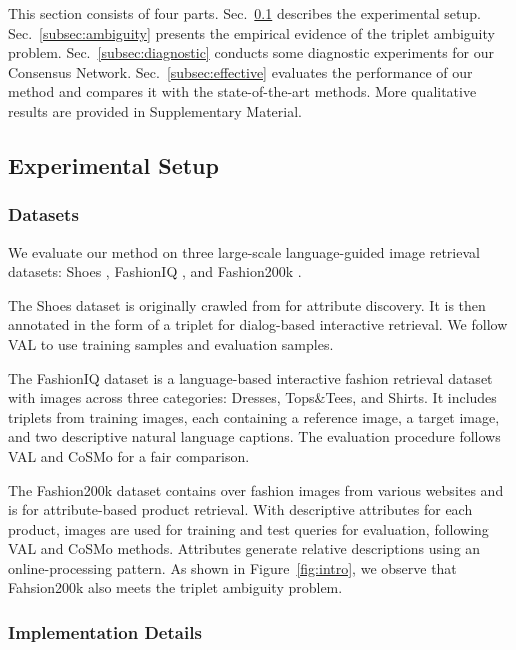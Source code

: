\documentclass[sigconf]{acmart}
\begin{document}
This section consists of four parts. Sec.~\ref{subsec:implement} describes the experimental setup. Sec.~\ref{subsec:ambiguity} presents the empirical evidence of the triplet ambiguity problem. Sec.~\ref{subsec:diagnostic} conducts some diagnostic experiments for our Consensus Network. Sec.~\ref{subsec:effective} evaluates the performance of our method and compares it with the state-of-the-art methods. More qualitative results are provided in Supplementary Material.

\subsection{Experimental Setup}
\label{subsec:implement}
\subsubsection{Datasets} 

We evaluate our method on three large-scale language-guided image retrieval datasets: Shoes \cite{berg2010automatic}, FashionIQ \cite{wu2021fashion}, and Fashion200k \cite{vo2019composing}.

The Shoes dataset \cite{berg2010automatic} is originally crawled from  for attribute discovery. It is then annotated in the form of a triplet for dialog-based interactive retrieval. We follow VAL \cite{chen2020image} to use  training samples and  evaluation samples.

The FashionIQ dataset \cite{wu2021fashion} is a language-based interactive fashion retrieval dataset with  images across three categories: Dresses, Tops\&Tees, and Shirts. It includes  triplets from  training images, each containing a reference image, a target image, and two descriptive natural language captions. The evaluation procedure follows VAL  \cite{chen2020image} and CoSMo \cite{lee2021cosmo} for a fair comparison. 

The Fashion200k dataset \cite{han2017automatic} contains over  fashion images from various websites and is for attribute-based product retrieval. With descriptive attributes for each product,  images are used for training and  test queries for evaluation, following VAL and CoSMo methods. Attributes generate relative descriptions using an online-processing pattern. As shown in Figure~\ref{fig:intro}, we observe that Fahsion200k also meets the triplet ambiguity problem. 

\subsubsection{Implementation Details} 
\end{document}
